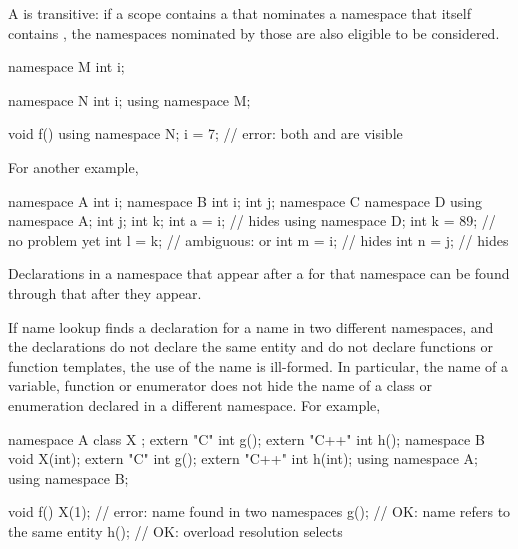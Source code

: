 \pnum
\begin{note}
A  is transitive: if a scope contains a
 that nominates a namespace that itself
contains , the namespaces nominated by those
 are also eligible to be considered.
\end{note}
\begin{example}
\begin{codeblock}
namespace M {
  int i;
}

namespace N {
  int i;
  using namespace M;
}

void f() {
  using namespace N;
  i = 7;            // error: both  and  are visible
}
\end{codeblock}

For another example,
\begin{codeblock}
namespace A {
  int i;
}
namespace B {
  int i;
  int j;
  namespace C {
    namespace D {
      using namespace A;
      int j;
      int k;
      int a = i;    //  hides 
    }
    using namespace D;
    int k = 89;     // no problem yet
    int l = k;      // ambiguous:  or 
    int m = i;      //  hides 
    int n = j;      //  hides 
  }
}
\end{codeblock}
\end{example}


\pnum
\begin{note}
Declarations in a namespace
that appear after a  for that namespace
can be found through that  after they appear.
\end{note}

\pnum
\begin{note}
If name lookup finds a declaration for a name in two different
namespaces, and the declarations do not declare the same entity and do
not declare functions or function templates, the use of the name is ill-formed.
In particular, the name of a variable, function or enumerator does not
hide the name of a class or enumeration declared in a different
namespace. For example,

\begin{codeblock}
namespace A {
  class X { };
  extern "C"   int g();
  extern "C++" int h();
}
namespace B {
  void X(int);
  extern "C"   int g();
  extern "C++" int h(int);
}
using namespace A;
using namespace B;

void f() {
  X(1);             // error: name  found in two namespaces
  g();              // OK: name  refers to the same entity
  h();              // OK: overload resolution selects 
}
\end{codeblock}
\end{note}


